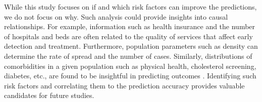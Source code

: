 \documentclass[12pt]{article}
\theoremstyle{definition}
\renewcommand{\_}{%
    \textunderscore\hspace{0pt}%
}
\begin{document}

While this study focuses on if and which risk factors can improve the
predictions, we do not focus on why. Such analysis could provide
insights into causal relationships. For example, information such as
health insurance and the number of hospitals and beds are often
related to the quality of services that affect early detection and
treatment. Furthermore, population parameters such as density can
determine the rate of spread and the number of cases. Similarly,
distributions of comorbidities in a given population such as physical
health, cholesterol screening, diabetes, etc., are found to be
insightful in predicting outcomes \cite{Maleki}. Identifying such risk
factors and correlating them to the prediction accuracy provides
valuable candidates for future studies.
\end{document}

